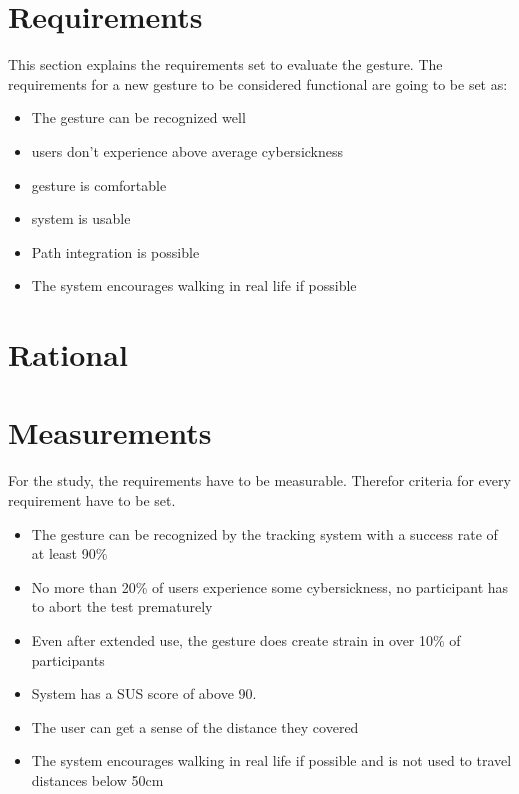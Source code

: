 


\section{Requirements}
This section explains the requirements set to evaluate the gesture.
The requirements for a new gesture to be considered functional are going to be set as:

\begin{itemize}
    \item The gesture can be recognized well
    \item users don't experience above average cybersickness
    \item gesture is comfortable
    \item system is usable
    \item Path integration is possible
    \item The system encourages walking in real life if possible
\end{itemize}


\section{Rational}


\section{Measurements}
For the study, the requirements have to be measurable. Therefor criteria for every requirement have to be set. 


\begin{itemize}
    \item The gesture can be recognized by the tracking system with a success rate of at least 90\%
    \item No more than 20\% of users experience some cybersickness, no participant has to abort the test prematurely
    \item Even after extended use, the gesture does create strain in over 10\% of participants
    \item System has a SUS score of above 90.
    \item The user can get a sense of the distance they covered
    \item The system encourages walking in real life if possible and is not used to travel distances below 50cm
\end{itemize}





